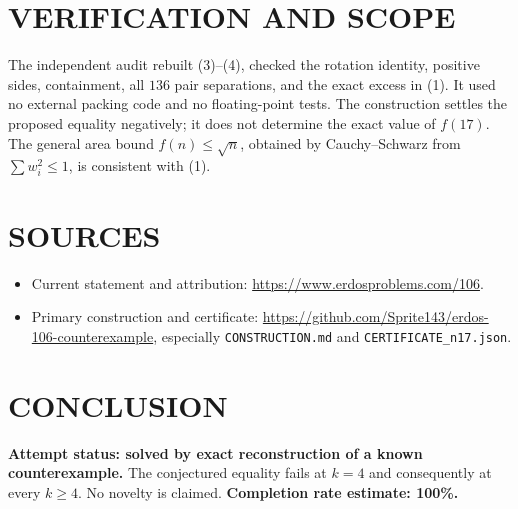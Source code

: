 \section{VERIFICATION AND SCOPE}
The independent audit rebuilt (3)--(4), checked the rotation identity, positive sides, containment, all $136$ pair separations, and the exact excess in (1). It used no external packing code and no floating-point tests. The construction settles the proposed equality negatively; it does not determine the exact value of $f(17)$. The general area bound $f(n)\leq\sqrt n$, obtained by Cauchy--Schwarz from $\sum w_i^2\leq1$, is consistent with (1).

\section{SOURCES}
\begin{itemize}
\item Current statement and attribution: \url{https://www.erdosproblems.com/106}.
\item Primary construction and certificate: \url{https://github.com/Sprite143/erdos-106-counterexample}, especially \texttt{CONSTRUCTION.md} and \texttt{CERTIFICATE\_n17.json}.
\end{itemize}

\section{CONCLUSION}
\textbf{Attempt status: solved by exact reconstruction of a known counterexample.} The conjectured equality fails at $k=4$ and consequently at every $k\geq4$. No novelty is claimed.
\textbf{Completion rate estimate: 100\%.}

